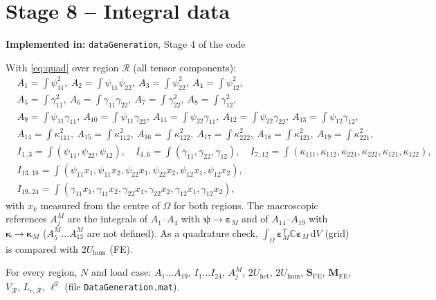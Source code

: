 \documentclass[11pt,a4paper]{article}
\newcommand{\C}{\mathbb{C}}                     %
\newcommand{\epsM}{\bm{\varepsilon}_{M}}
\newcommand{\bpsi}{\bm{\psi}}
\newcommand{\bkap}{\bm{\kappa}}
\newcommand{\dd}{\,\mathrm{d}}
\newcommand{\code}[1]{\texttt{#1}}
\theoremstyle{plain}
\theoremstyle{remark}
\newcommand{\implementedin}[1]{\begin{codebox}\textbf{Implemented in:} #1\end{codebox}}
\begin{document}
\section{Stage 8 -- Integral data}
\label{sec:stage8}
\implementedin{\code{dataGeneration}, Stage 4 of the code}
With \eqref{eq:quad} over region $\mathcal R$ (all tensor components):
\begin{align}
  &A_1=\!\int\!\psi_{11}^2,\ A_2=\!\int\!\psi_{11}\psi_{22},\ A_3=\!\int\!\psi_{22}^2,\ A_4=\!\int\!\psi_{12}^2,
  \nonumber\\
  &A_5=\!\int\!\gamma_{11}^2,\ A_6=\!\int\!\gamma_{11}\gamma_{22},\ A_7=\!\int\!\gamma_{22}^2,\ A_8=\!\int\!\gamma_{12}^2,
  \nonumber\\
  &A_9=\!\int\!\psi_{11}\gamma_{11},\ A_{10}=\!\int\!\psi_{11}\gamma_{22},\ A_{11}=\!\int\!\psi_{22}\gamma_{11},\
  A_{12}=\!\int\!\psi_{22}\gamma_{22},\ A_{13}=\!\int\!\psi_{12}\gamma_{12},
  \nonumber\\
  &A_{14}=\!\int\!\kappa_{111}^2,\ A_{15}=\!\int\!\kappa_{112}^2,\ A_{16}=\!\int\!\kappa_{122}^2,\
  A_{17}=\!\int\!\kappa_{222}^2,\ A_{18}=\!\int\!\kappa_{121}^2,\ A_{19}=\!\int\!\kappa_{221}^2,
  \label{eq:A}
\end{align}
\begin{align}
  &I_{1..3}=\!\int\!(\psi_{11},\psi_{22},\psi_{12}),\quad
  I_{4..6}=\!\int\!(\gamma_{11},\gamma_{22},\gamma_{12}),\quad
  I_{7..12}=\!\int\!(\kappa_{111},\kappa_{112},\kappa_{221},\kappa_{222},\kappa_{121},\kappa_{122}),
  \nonumber\\
  &I_{13..18}=\!\int\!(\psi_{11}x_1,\psi_{11}x_2,\psi_{22}x_1,\psi_{22}x_2,\psi_{12}x_1,\psi_{12}x_2),
  \nonumber\\
  &I_{19..24}=\!\int\!(\gamma_{11}x_1,\gamma_{11}x_2,\gamma_{22}x_1,\gamma_{22}x_2,\gamma_{12}x_1,\gamma_{12}x_2),
  \label{eq:I}
\end{align}
with $x_k$ measured from the centre of $\Omega$ for both regions. The macroscopic references
$A^M_j$ are the integrals of $A_1$--$A_4$ with $\bpsi\to\epsM$ and of $A_{14}$--$A_{19}$ with
$\bkap\to\bkap_M$ ($A^M_5\dots A^M_{13}$ are not defined). As a quadrature check,
$\int_\Omega\epsM^T\C\epsM\dd V$ (grid) is compared with $2U_{\mathrm{hom}}$ (FE).
\begin{delivers}
For every region, $N$ and load case: $A_1\dots A_{19}$, $I_1\dots I_{24}$, $A^M_j$,
$2U_{\mathrm{het}}$, $2U_{\mathrm{hom}}$, $\bm S_{\mathrm{FE}}$, $\bm M_{\mathrm{FE}}$,
$V_{\mathcal R}$, $L_{r,\mathcal R}$, $\ell^2$ (file \code{DataGeneration.mat}).
\end{delivers}
\end{document}
